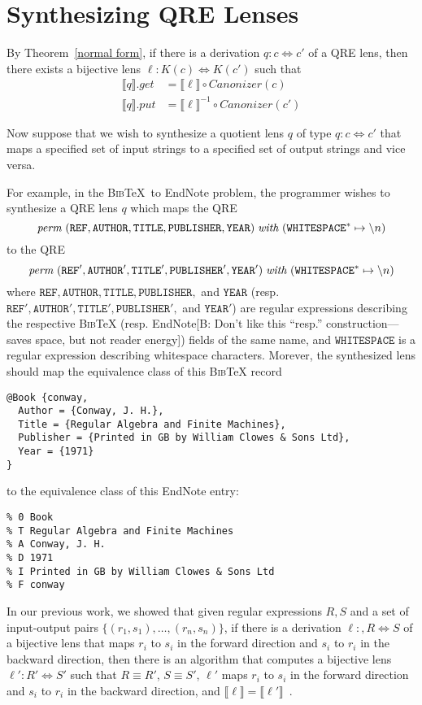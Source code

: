 \documentclass{svproc}
\newcommand{\FINISH}[3]{\ifdraft\textcolor{#1}{[#2: #3]}\fi}
\newcommand{\bcp}[1]{\FINISH{dkred}{B}{#1}}
\newcommand{\re}[1]{\ensuremath{\mathtt{#1}}}
\newcommand{\perm}[2]{\ensuremath{\mathit{perm}\; (#1)\; \mathit{with}\; #2}}
\newcommand{\canonizer}{\ensuremath{\mathit{Canonizer}}}
\begin{document}
\section{Synthesizing QRE Lenses}
\label{synth}
By Theorem~\ref{normal form}, if there is a derivation $q : c \Leftrightarrow
c'$ of a QRE lens, then there exists a bijective lens $\ell : K(c)
\Leftrightarrow K(c')$ such that
\begin{align*}
  \llbracket q \rrbracket.get &= \llbracket \ell \rrbracket\circ \canonizer(c)\\
  \llbracket q \rrbracket.put &= \llbracket \ell \rrbracket^{-1} \circ
                                \canonizer(c')
\end{align*}


Now suppose that we wish to synthesize a quotient lens $q$ of type $q: c
\Leftrightarrow c'$ that maps a specified set of input strings to a
specified set of output strings and vice versa.

For example, in the \textsc{Bib}\TeX\ to EndNote problem, the programmer wishes
to synthesize a QRE lens $q$ which maps the QRE
$$\perm{\re{REF}, \re{AUTHOR}, \re{TITLE}, \re{PUBLISHER},
  \re{YEAR}}{(\re{WHITESPACE}^* \mapsto \string \n)}$$ 
to the QRE
$$\perm{\re{REF'}, \re{AUTHOR'}, \re{TITLE'}, \re{PUBLISHER'},
  \re{YEAR'}}{(\re{WHITESPACE}^* \mapsto \string \n)}$$
where $\re{REF}, \re{AUTHOR}, \re{TITLE}, \re{PUBLISHER},$ and $\re{YEAR}$
(resp. $\re{REF'}, \re{AUTHOR'}, \re{TITLE'}, \re{PUBLISHER'},$ and
$\re{YEAR'}$) are regular expressions describing the respective
\textsc{Bib}\TeX\; (resp. EndNote\bcp{Don't like this ``resp.''
  construction---saves space, but not reader energy}) fields of the same
name, and 
$\re{WHITESPACE}$ is a regular expression describing whitespace
characters. Morever, the synthesized lens should map the equivalence
class of this \textsc{Bib}\TeX{} record
\begin{verbatim}
@Book {conway,
  Author = {Conway, J. H.},
  Title = {Regular Algebra and Finite Machines},
  Publisher = {Printed in GB by William Clowes & Sons Ltd},
  Year = {1971}
}
\end{verbatim}
\noindent to the equivalence class of this EndNote entry:
\begin{verbatim}
% 0 Book
% T Regular Algebra and Finite Machines
% A Conway, J. H.
% D 1971
% I Printed in GB by William Clowes & Sons Ltd
% F conway
\end{verbatim}

In our previous work, we showed that given regular expressions $R, S$ and a set
of input-output pairs $\{(r_1, s_1), \ldots, (r_n, s_n)\}$, if there is a
derivation $\ell :, R \Leftrightarrow S$ of a bijective lens that maps $r_i$ to
$s_i$ in the forward direction and $s_i$ to $r_i$ in the backward direction,
then there is an algorithm that computes a bijective lens $\ell' : R'
\Leftrightarrow S'$ such that $R \equiv R'$, $S \equiv S'$, $\ell'$ maps $r_i$
to $s_i$ in the forward direction and $s_i$ to $r_i$ in the backward
direction, and $\llbracket \ell \rrbracket = \llbracket \ell'
\rrbracket$~\cite{popl18}.
\end{document}
